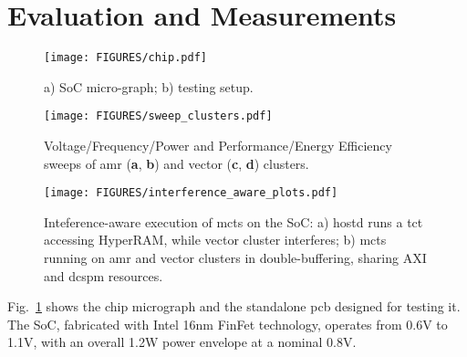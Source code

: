 \section{Evaluation and Measurements}
\label{sec:evaluation-measurements}
\begin{figure}[t]
    \centering
    \texttt{[image: FIGURES/chip.pdf]}
    \caption{a) SoC micro-graph; b) testing setup. }
    \label{fig:chip-die}
\end{figure}
\begin{figure}[t]
    \centering
    \texttt{[image: FIGURES/sweep\_clusters.pdf]}
    \caption{Voltage/Frequency/Power and Performance/Energy Efficiency sweeps of \gls{amr}  (\textbf{a}, \textbf{b}) and vector (\textbf{c}, \textbf{d}) clusters.}
    \label{fig:clus-sweeps2}
\end{figure}
\begin{figure}[t]
    \centering
    \texttt{[image: FIGURES/interference\_aware\_plots.pdf]}
    \caption{Inteference-aware execution of \glspl{mct} on the SoC: a) \gls{hostd} runs a \gls{tct} accessing HyperRAM, while vector cluster interferes; b) \glspl{mct} running on \gls{amr} and vector clusters in double-buffering, sharing AXI and \gls{dcspm} resources.}
    \label{fig:interference-free}
\end{figure}

Fig.~\ref{fig:chip-die} shows the chip micrograph and the standalone \gls{pcb} designed for testing it. The SoC, fabricated with Intel 16nm FinFet technology, operates from 0.6V to 1.1V, with an overall 1.2W power envelope at a nominal 0.8V. %


